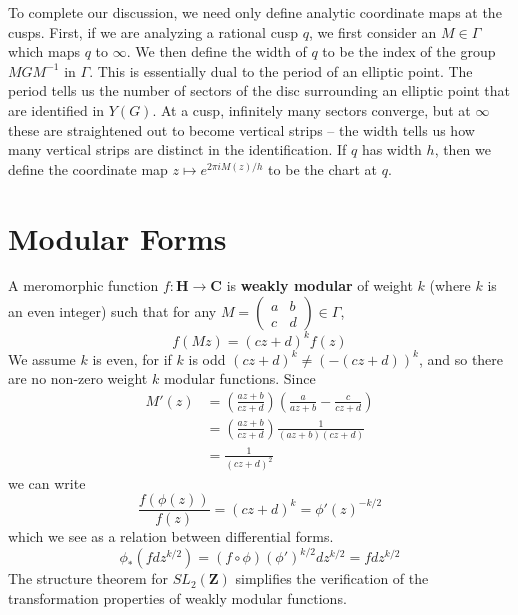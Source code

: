To complete our discussion, we need only define analytic coordinate maps at the cusps. First, if we are analyzing a rational cusp $q$, we first consider an $M \in \Gamma$ which maps $q$ to $\infty$. We then define the width of $q$ to be the index of the group $MGM^{-1}$ in $\Gamma$. This is essentially dual to the period of an elliptic point. The period tells us the number of sectors of the disc surrounding an elliptic point that are identified in $Y(G)$. At a cusp, infinitely many sectors converge, but at $\infty$ these are straightened out to become vertical strips -- the width tells us how many vertical strips are distinct in the identification. If $q$ has width $h$, then we define the coordinate map $z \mapsto e^{2 \pi i M(z) / h}$ to be the chart at $q$.

\section{Modular Forms}

A meromorphic function $f: \mathbf{H} \to \mathbf{C}$ is {\bf weakly modular} of weight $k$ (where $k$ is an even integer) such that for any $M = \left(\begin{smallmatrix} a & b \\ c & d \end{smallmatrix}\right) \in \Gamma$,
%
\[ f(Mz) = (cz + d)^k f(z) \]
%
We assume $k$ is even, for if $k$ is odd $(cz + d)^k \neq (-(cz + d))^k$, and so there are no non-zero weight $k$ modular functions. Since
%
\begin{align*}
    M'(z) &= \left( \frac{az + b}{cz + d} \right) \left( \frac{a}{az + b} - \frac{c}{cz + d} \right)\\
    &= \left( \frac{az + b}{cz + d} \right) \frac{1}{(az + b)(cz + d)}\\
    &= \frac{1}{(cz + d)^2}
\end{align*}
%
we can write
%
\[ \frac{f(\phi(z))}{f(z)}  = (cz + d)^k = \phi'(z)^{-k/2} \]
%
which we see as a relation between differential forms.
%
\[ \phi_*(f dz^{k/2}) = (f \circ \phi) (\phi')^{k/2} dz^{k/2} = f dz^{k/2} \]
%
The structure theorem for $SL_2(\mathbf{Z})$ simplifies the verification of the transformation properties of weakly modular functions.


